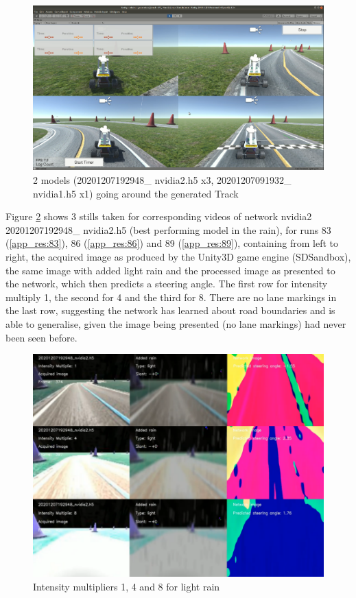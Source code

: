 \begin{figure}[ht]
 \centering 
 \includegraphics[width=\textwidth]{Figures/2948x3_1932x1_genTrack.png}
 \caption{2 models (20201207192948\_ nvidia2.h5 x3, 20201207091932\_ nvidia1.h5 x1) going around the generated Track}
 \label{fig:2948x3_1932x1_genTrack} 
\end{figure}

Figure \ref{fig:20201207192948_nvidia2_mult_1_4_8_light} shows 3 stills taken for corresponding videos of network nvidia2 20201207192948\_ nvidia2.h5 (best performing model in the rain), for runs 83 (\ref{app_res:83}), 86 (\ref{app_res:86}) and 89 (\ref{app_res:89}), containing from left to right, the acquired image as produced by the Unity3D game engine (SDSandbox), the same image with added light rain and the processed image as presented to the network, which then predicts a steering angle. The first row for intensity multiply 1, the second for 4 and the third for 8. There are no lane markings in the last row, suggesting the network has learned about road boundaries and is able to generalise, given the image being presented (no lane markings) had never been seen before.

\begin{figure}[ht]
 \centering 
 \includegraphics[width=\textwidth]{Figures/20201207192948_nvidia2_mult_1_4_8_light.png}
 \caption{Intensity multipliers 1, 4 and 8 for light rain}
 \label{fig:20201207192948_nvidia2_mult_1_4_8_light}
\end{figure}

